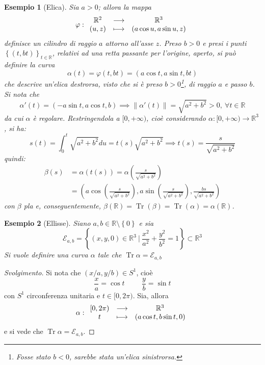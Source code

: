 \documentclass[12pt]{article}
\theoremstyle{style}
\newtheorem{esempio}{Esempio}[section]
\newenvironment{svolgimento}{\renewcommand\qedsymbol{$\blacksquare$}\begin{proof}[Svolgimento]}{\end{proof}}
\numberwithin{equation}{subsection}
\begin{document}
\begin{esempio}
	[Elica]
Sia $a > 0$; allora la mappa
\[
\varphi :
\begin{array}
	{c c c}
	\mathbb{R}^2 & \longrightarrow & \mathbb{R}^3\\
	(u,z) &\longmapsto & (a \cos u , a \sin u , z)
\end{array}
\] 
definisce un cilindro di raggio $a$ attorno all'asse $z$.
Preso $b > 0$ e presi i punti $\left\{ (t,bt) \right\} _{t \in \mathbb{R}} $, relativi ad una retta passante per l'origine, aperto, si pu\`o definire la curva 
\[
\alpha (t) = \varphi (t,bt) = (a \cos t , a \sin t , bt)
\] 
che descrive un'\textit{elica destrorsa}, visto che si \`e preso $b>0$\footnote{Fosse stato $b<0$, sarebbe stata un'\textit{elica sinistrorsa}.}, di raggio $a$ e passo $b$.
Si nota che
\[
\alpha '(t) = (-a \sin t, a \cos t , b) \implies \left\lVert \alpha '(t) \right\rVert =\sqrt{a^2 + b^2} > 0, \ \forall t \in \mathbb{R}
\] 
da cui $\alpha $ \`e regolare. 
Restringendola a $[0,+\infty)$, cio\`e considerando $\alpha : [0,+\infty) \to \mathbb{R}^{3} $, si ha:
\[
	s(t) = \int_{0} ^t \sqrt{a^2 + b^2 }  du = t(s) \sqrt{a^2 + b^2} \implies t(s) = \frac{s}{\sqrt{a^2 +b^2}}
\] 
quindi:
\[
\begin{split}
		 \beta (s) &= \alpha (t(s)) = \alpha  \left(\frac{s}{\sqrt{a^2 + b^2} }\right) \\
	&= \left(a \cos \left(\frac{s}{\sqrt{a^2+b^2} }\right) , a\sin \left(\frac{s}{\sqrt{a^2 + b^2} }\right),\frac{bs}{\sqrt{a^2 + b^2} } \right)
	\end{split} 
\] 
con $\beta $ pla e, conseguentemente, $\beta (\mathbb{R}) = \operatorname{Tr} (\beta ) = \operatorname{Tr} (\alpha ) = \alpha (\mathbb{R})$.
\end{esempio}
\begin{esempio}
	[Ellisse]
	Siano $a,b \in \mathbb{R}\setminus\left\{ 0 \right\} $ e sia 
	\[
	\mathcal{E} _{a,b} = \left\{ (x,y,0) \in \mathbb{R}^3  \ \bigg\lvert \ \frac{x^2}{a^2} + \frac{y^2}{b^2} = 1\right\} \subset \mathbb{R}^3
	\] 
	Si vuole definire una curva $\alpha $ tale che $\operatorname{Tr} \alpha = \mathcal{E} _{a,b} $
\end{esempio}
	\begin{svolgimento}
		Si nota che $(x /  a , y / b) \in S^1$, cio\`e
	\[
	\frac{x}{a} = \cos t \hspace{1cm}\frac{y}{b} = \sin t
	\] 
	con $S^1$ circonferenza unitaria e $t\in [0,2\pi)$.
	Sia, allora
	\[
\alpha :
	\begin{array}
		{c c c}
		[0,2\pi) &\longrightarrow & \mathbb{R}^3\\
		t & \longmapsto & (a \cos t , b \sin t, 0)
	\end{array}
	\] 
 e si vede che $\operatorname{Tr} \alpha  = \mathcal{E} _{a,b} $.

	\end{svolgimento}
\end{document}
